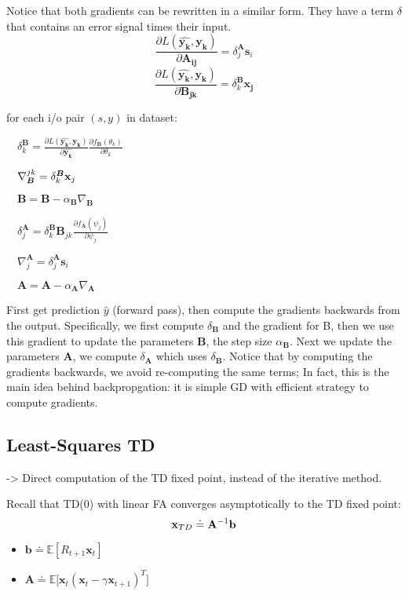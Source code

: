 \documentclass[sutton_barto_notes.tex]{subfiles}
\begin{document}
Notice that both gradients can be rewritten in a similar form. They have a term $\delta$ that contains an error signal times their input.
$$\frac{\partial L(\hat{\bm{y_k}}, \bm{y_k})}{\partial \bm{A_{ij}}} = \delta_j^{\bm{A}}\bm{s}_i$$
$$\frac{\partial L(\hat{\bm{y_k}}, \bm{y_k})}{\partial \bm{B_{jk}}} = \delta_k^{\bm{B}}\bm{x_j}$$

\begin{tcolorbox}[width=1.1\textwidth,title={one-hidden layer backprop algorithm}]
for each i/o pair $(s,y)$ in dataset:

$\quad\delta_k^{\bm{B}} = \frac{\partial L(\hat{\bm{y_k}}, \bm{y_k})}{\partial \hat{\bm{y_k}}}\frac{\partial f_{\bm{B}}(\theta_k)}{\partial\theta_k}$

$\quad\nabla_{\bm{B}}^{jk}=\delta_k^{\bm{B}}{\operatorname*{\mathbf{x}}}_j$

$\quad\bm{B} = \bm{B} - \alpha_{\bm{B}}\nabla_{\bm{B}}$

$\quad\delta_j^{\bm{A}} = \delta_k^{\bm{B}}\bm{B}_{jk} \frac{\partial f_{\bm{A}}(\psi_j) }{\partial \psi_j}$

$\quad\nabla_j^{\bm{A}} = \delta_j^{\bm{A}}\bm{s}_i$

$\quad\bm{A} = \bm{A} - \alpha_{\bm{A}}\nabla_{\bm{A}}$
\end{tcolorbox}
First get prediction $\hat{y}$ (forward pass), then compute the gradients backwards from the output. Specifically, we first compute $\delta_{\bm{B}}$ and the gradient for B, then we use this gradient to update the parameters $\bm{B}$, the step size $\alpha_{\bm{B}}$. Next we update the parameters $\bm{A}$, we compute $\delta_{\bm{A}}$ which uses $\delta_{\bm{B}}$. Notice that by computing the gradients backwards, we avoid re-computing the same terms; In fact, this is the main idea behind backpropgation: it is simple GD with efficient strategy to compute gradients.

\subsection{Least-Squares TD}

-> Direct computation of the TD fixed point, instead of the iterative method.

Recall that TD(0) with linear FA converges asymptotically to the TD fixed point:
$$ {\operatorname*{\mathbf{x}}}_{TD} \doteq \mathbf{A}^{-1}{\operatorname*{\mathbf{b}}} $$

\begin{itemize}
\item $\mathbf{b} \doteq \mathbb{E}[R_{t+1} \mathbf{x}_t]$ 
\item $\mathbf{A} \doteq \mathbb{E} \big[ \mathbf{x}_t(\mathbf{x}_t - \gamma \mathbf{x}_{t+1})^T\big]$ 
\end{itemize}
\end{document}
